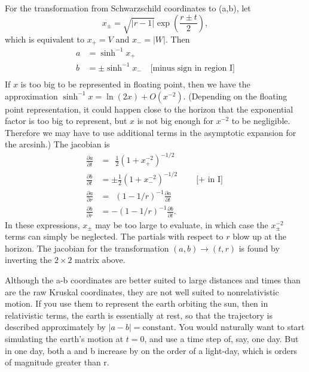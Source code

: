 \documentclass{article}
\begin{document}
For the transformation from Schwarzschild coordinates to (a,b), let
\begin{equation*}
  x_\pm = \sqrt{|r-1|}\exp\left(\frac{r\pm t}{2}\right),
\end{equation*}
which is equivalent to $x_+= V$ and $x_-=|W|$.
Then
\begin{align*}
  a &= \sinh^{-1} x_+ \\
  b &= \pm\sinh^{-1} x_- \quad \text{[minus sign in region I]} \\
\end{align*}
If $x$ is too big to be represented in floating point, then we have the approximation
$\sinh^{-1} x = \ln(2x)+O(x^{-2})$. (Depending on the floating point representation,
it could happen close to the horizon that the exponential
factor is too big to represent, but $x$ is not big enough for $x^{-2}$ to be negligible.
Therefore we may have to use additional terms in the asymptotic expansion for the arcsinh.)
The jacobian is
\begin{align*}
  \frac{\partial a}{\partial t} &= \ \ \frac{1}{2}(1+x_+^{-2})^{-1/2} \\
  \frac{\partial b}{\partial t} &= \pm\frac{1}{2}(1+x_-^{-2})^{-1/2} \qquad \text{[$+$ in I]} \\
  \frac{\partial a}{\partial r} &= \ \ (1-1/r)^{-1} \frac{\partial a}{\partial t} \\
  \frac{\partial b}{\partial r} &= -(1-1/r)^{-1} \frac{\partial b}{\partial t}.
\end{align*}
In these expressions, $x_\pm$ may be too large to evaluate, in which case the $x_\pm^{-2}$ terms
can simply be neglected. The partials with respect to $r$ blow up at the horizon. The jacobian
for the transformation $(a,b)\rightarrow(t,r)$ is found by inverting the $2\times 2$ matrix
above.

Although the a-b coordinates are better suited to large distances and times than are the
raw Kruskal coordinates, they are not well suited to nonrelativistic motion. If you use them
to represent the earth orbiting the sun, then in relativistic terms, the earth is essentially
at rest, so that the trajectory is described approximately by $|a-b|=\text{constant}$.
You would naturally want to start simulating the earth's motion at $t=0$, and use a time step
of, say, one day. But in one day, both a and b increase by on the order of a light-day, which
is orders of magnitude greater than r.
\end{document}
